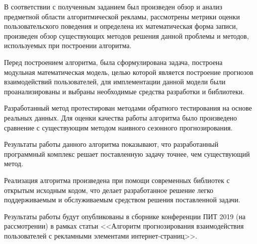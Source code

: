 
В соответствии с полученным заданием был произведен обзор и анализ предметной области
алгоритмической рекламы, рассмотрены метрики оценки пользовательского поведения и определена
их математическая форма записи, произведен обзор существующих методов решения данной проблемы и
методов, используемых при построении алгоритма.

Перед построением алгоритма, была сформулирована задача, построена модульная математическая модель, 
целью которой является построение прогнозов взаимодействий пользователей, для имплементации 
данной модели были проанализированы и выбраны необходимые средства разработки и библиотеки.

Разработанный метод протестирован методами обратного тестирования на основе реальных данных.
Для оценки качества работы алгоритма было произведено сравнение с существующим методом наивного
сезонного прогнозирования.

Результаты работы данного алгоритма показывают, что разработанный программный комплекс решает
поставленную задачу точнее, чем существующий метод.

Реализация алгоритма произведена при помощи современных библиотек с открытым
исходным кодом, что делает разработанное решение легко поддерживаемым и обслуживаемым 
средством решения поставленной задачи.

Результаты работы будут опубликованы в сборнике конференции ПИТ 2019 (на рассмотрении) в
рамках статьи <<Алгоритм прогнозирования взаимодействия пользователей с рекламными элементами
интернет-страниц>>.